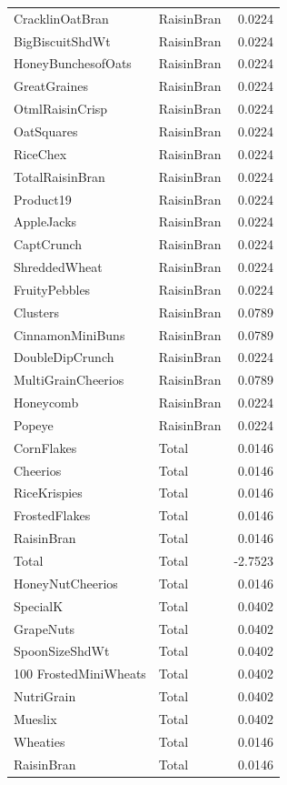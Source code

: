 \begin{longtable}{llr}
CracklinOatBran & RaisinBran & 0.0224 \\
BigBiscuitShdWt & RaisinBran & 0.0224 \\
HoneyBunchesofOats & RaisinBran & 0.0224 \\
GreatGraines & RaisinBran & 0.0224 \\
OtmlRaisinCrisp & RaisinBran & 0.0224 \\
OatSquares & RaisinBran & 0.0224 \\
RiceChex & RaisinBran & 0.0224 \\
TotalRaisinBran & RaisinBran & 0.0224 \\
Product19 & RaisinBran & 0.0224 \\
AppleJacks & RaisinBran & 0.0224 \\
CaptCrunch & RaisinBran & 0.0224 \\
ShreddedWheat & RaisinBran & 0.0224 \\
FruityPebbles & RaisinBran & 0.0224 \\
Clusters & RaisinBran & 0.0789 \\
CinnamonMiniBuns & RaisinBran & 0.0789 \\
DoubleDipCrunch & RaisinBran & 0.0224 \\
MultiGrainCheerios & RaisinBran & 0.0789 \\
Honeycomb & RaisinBran & 0.0224 \\
Popeye & RaisinBran & 0.0224 \\
CornFlakes & Total & 0.0146 \\
Cheerios & Total & 0.0146 \\
RiceKrispies & Total & 0.0146 \\
FrostedFlakes & Total & 0.0146 \\
RaisinBran & Total & 0.0146 \\
Total & Total & -2.7523 \\
HoneyNutCheerios & Total & 0.0146 \\
SpecialK & Total & 0.0402 \\
GrapeNuts & Total & 0.0402 \\
SpoonSizeShdWt & Total & 0.0402 \\
100%
FrostedMiniWheats & Total & 0.0402 \\
NutriGrain & Total & 0.0402 \\
Mueslix & Total & 0.0402 \\
Wheaties & Total & 0.0146 \\
RaisinBran & Total & 0.0146 \\

\end{longtable}
